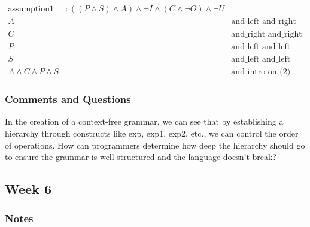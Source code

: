 \documentclass{article}
\theoremstyle{theorem}
\theoremstyle{definition}
\theoremstyle{remark}
\begin{document}
\begin{align}
  \text{assumption1} &: ((P \wedge S) \wedge A) \wedge \neg I \wedge (C \wedge \neg O) \wedge \neg U & \text{} \\
  A && \text{and\_left and\_right on (1)} \\
  C && \text{and\_right and\_right and\_left and\_left on (1)} \\
  P && \text{and\_left and\_left and\_left on (1)} \\
  S && \text{and\_left and\_left and\_right on (1)} \\
  A \wedge C \wedge P \wedge S && \text{and\_intro on (2) (3) (4) (5)}
\end{align}

\subsubsection{Comments and Questions}

In the creation of a context-free grammar, we can see that by establishing a hierarchy through constructs like exp, exp1, exp2, etc., we can control the order of operations. How can programmers determine how deep the hierarchy should go to ensure the grammar is well-structured and the language doesn't break?

\subsection{Week 6}

\subsubsection{Notes}
\end{document}
